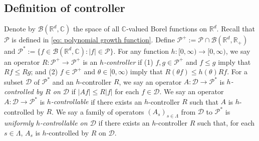 \documentclass[12pt,a4paper]{amsart}
\theoremstyle{plain}
\theoremstyle{definition}
\numberwithin{equation}{section}
\begin{document}
\subsection{Definition of controller}
\label{sec: controller}
Denote by $\mathcal B(\mathbb R^d, \mathbb C)$ the space of all $\mathbb C$-valued Borel functions on $\mathbb R^d$.
Recall that $\mathcal P$ is defined in \eqref{eq: polynomial growth function}.
Define $\mathcal P^+:= \mathcal P \cap \mathcal B(\mathbb R^d, \mathbb R_+)$ and $\mathcal P^*:= \{f\in \mathcal B(\mathbb R^d, \mathbb C): |f|\in \mathcal P\}$.
For any function $h: [0,\infty) \to [0,\infty)$, we say an operator $R: \mathcal P^+ \to \mathcal P^+$ is an \emph{$h$-controller} if
(1) $f, g\in \mathcal P^+$ and $f\leq g$ imply that $Rf \leq Rg$; and (2) $f \in \mathcal P^+$ and $\theta \in [0,\infty)$ imply that $ R (\theta f)\leq h(\theta) Rf$.
For a subset $\mathcal D$ of $\mathcal P^*$ and an $h$-controller $R$, we say an operator $A : \mathcal D \to \mathcal P^*$ is \emph{$h$-controlled by $R$ on $\mathcal D$} if $|Af| \leq R|f|$ for each $f\in \mathcal D$.
We say an operator $A : 
\mathcal D \to \mathcal P^*$ is \emph{$h$-controllable} if there exists an $h$-controller $R$ such that $A$ is $h$-controlled by $R$.
We say a family of operators $(A_s)_{s\in \Lambda}$ from $\mathcal D $ to $\mathcal P^*$ is \emph{uniformly $h$-controllable on $\mathcal D$} if there exists an $h$-controller $R$ such that, for each $s\in \Lambda$, $A_s$ is $h$-controlled by $R$ on $\mathcal D$.
\end{document}
